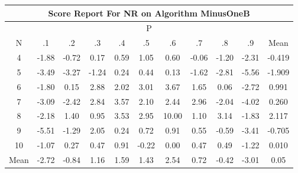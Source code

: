 \documentclass[11pt,a4paper]{report}
\begin{document}
\begin{longtable}{ | c || c | c | c | c | c | c | c | c | c || c |}
\hline
\multicolumn{11}{|c|}{ Score Report For NR on Algorithm MinusOneB} \\
\hline
\multicolumn{11}{|c|}{ P } \\
\hline
N & .1 & .2 & .3 & .4 & .5 & .6 & .7 & .8 & .9 & Mean\\
 \hline
 \hline
 \endhead
  4 &  \cellcolor[HTML]{FFCFCF} -1.88 &  \cellcolor[HTML]{FFEFEF} -0.72 &  \cellcolor[HTML]{F7F7FF} 0.17 &  \cellcolor[HTML]{EFEFFF} 0.59 &  \cellcolor[HTML]{E7E7FF} 1.05 &  \cellcolor[HTML]{EFEFFF} 0.60 &  \cellcolor[HTML]{FFFFFF} -0.06 &  \cellcolor[HTML]{FFDFDF} -1.20 &  \cellcolor[HTML]{FFC7C7} -2.31 & -0.419 \\
  5 &  \cellcolor[HTML]{FFA7A7} -3.49 &  \cellcolor[HTML]{FFAFAF} -3.27 &  \cellcolor[HTML]{FFDFDF} -1.24 &  \cellcolor[HTML]{F7F7FF} 0.24 &  \cellcolor[HTML]{F7F7FF} 0.44 &  \cellcolor[HTML]{FFFFFF} 0.13 &  \cellcolor[HTML]{FFD7D7} -1.62 &  \cellcolor[HTML]{FFB7B7} -2.81 &  \cellcolor[HTML]{FF7070} -5.56 & -1.909 \\
  6 &  \cellcolor[HTML]{FFCFCF} -1.80 &  \cellcolor[HTML]{FFFFFF} 0.15 &  \cellcolor[HTML]{B7B7FF} 2.88 &  \cellcolor[HTML]{CFCFFF} 2.02 &  \cellcolor[HTML]{B7B7FF} 3.01 &  \cellcolor[HTML]{9F9FFF} 3.67 &  \cellcolor[HTML]{D7D7FF} 1.65 &  \cellcolor[HTML]{FFFFFF} 0.06 &  \cellcolor[HTML]{FFB7B7} -2.72 & 0.991 \\
  7 &  \cellcolor[HTML]{FFAFAF} -3.09 &  \cellcolor[HTML]{FFBFBF} -2.42 &  \cellcolor[HTML]{B7B7FF} 2.84 &  \cellcolor[HTML]{A7A7FF} 3.57 &  \cellcolor[HTML]{C7C7FF} 2.10 &  \cellcolor[HTML]{BFBFFF} 2.44 &  \cellcolor[HTML]{B7B7FF} 2.96 &  \cellcolor[HTML]{FFCFCF} -2.04 &  \cellcolor[HTML]{FF9797} -4.02 & 0.260 \\
  8 &  \cellcolor[HTML]{FFC7C7} -2.18 &  \cellcolor[HTML]{DFDFFF} 1.40 &  \cellcolor[HTML]{E7E7FF} 0.95 &  \cellcolor[HTML]{A7A7FF} 3.53 &  \cellcolor[HTML]{B7B7FF} 2.95 &  \cellcolor[HTML]{0808FF} 10.00 &  \cellcolor[HTML]{E7E7FF} 1.10 &  \cellcolor[HTML]{AFAFFF} 3.14 &  \cellcolor[HTML]{FFCFCF} -1.83 & 2.117 \\
  9 &  \cellcolor[HTML]{FF7878} -5.51 &  \cellcolor[HTML]{FFDFDF} -1.29 &  \cellcolor[HTML]{CFCFFF} 2.05 &  \cellcolor[HTML]{F7F7FF} 0.24 &  \cellcolor[HTML]{EFEFFF} 0.72 &  \cellcolor[HTML]{E7E7FF} 0.91 &  \cellcolor[HTML]{EFEFFF} 0.55 &  \cellcolor[HTML]{FFEFEF} -0.59 &  \cellcolor[HTML]{FFA7A7} -3.41 & -0.705 \\
  10 &  \cellcolor[HTML]{FFE7E7} -1.07 &  \cellcolor[HTML]{F7F7FF} 0.27 &  \cellcolor[HTML]{F7F7FF} 0.47 &  \cellcolor[HTML]{E7E7FF} 0.91 &  \cellcolor[HTML]{FFF7F7} -0.22 &  \cellcolor[HTML]{FFFFFF} 0.00 &  \cellcolor[HTML]{F7F7FF} 0.47 &  \cellcolor[HTML]{EFEFFF} 0.49 &  \cellcolor[HTML]{FFDFDF} -1.22 & 0.010 \\
 \hline
 \hline
Mean &  \cellcolor[HTML]{FFB7B7} -2.72 &  \cellcolor[HTML]{FFE7E7} -0.84 &  \cellcolor[HTML]{DFDFFF} 1.16 &  \cellcolor[HTML]{D7D7FF} 1.59 &  \cellcolor[HTML]{D7D7FF} 1.43 &  \cellcolor[HTML]{BFBFFF} 2.54 &  \cellcolor[HTML]{EFEFFF} 0.72 &  \cellcolor[HTML]{FFF7F7} -0.42 &  \cellcolor[HTML]{FFB7B7} -3.01 &  \cellcolor[HTML]{FFFFFF} 0.05
\end{longtable}
\end{document}
